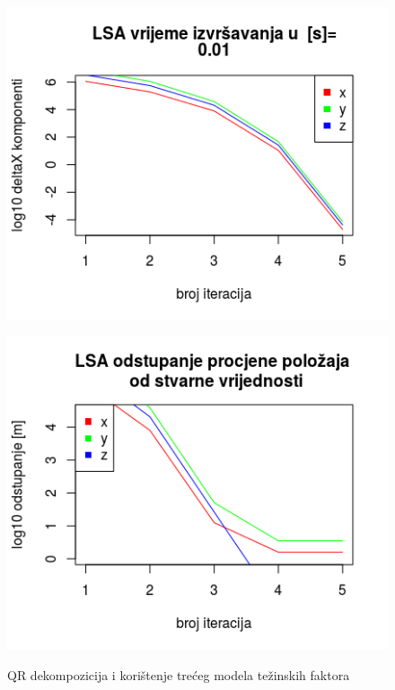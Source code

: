 \documentclass[a4paper,twoside,12pt]{memoir} %
\begin{document}
\begin{figure}[H]
	\begin{minipage}{0.45\textwidth}
		\centering
		\includegraphics[width=1\textwidth]{3LSAdelta3l10QRb}
		\label{fig:3LSAdelta3l10QR}
	\end{minipage}%
	\hspace{1cm}
	\begin{minipage}{0.45\textwidth}
		
		\includegraphics[width=1\textwidth]{3LSAreal3l10QRb}
		\label{fig:3LSAreal3l10QR}
	\end{minipage}%
	\caption{QR dekompozicija i korištenje trećeg modela težinskih faktora}
	\label{fig:3LSA3l10QR}
\end{figure}
\end{document}
